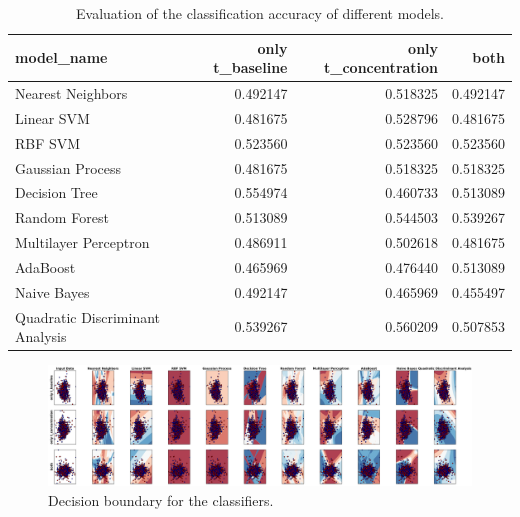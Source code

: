 \documentclass[12pt]{article}
\begin{document}
\begin{table}[h]


\begin{tabular}{lrrr}
\toprule
                      model\_name &  only t\_baseline &  only t\_concentration &      both \\
\midrule
               Nearest Neighbors &         0.492147 &              0.518325 &  0.492147 \\
                      Linear SVM &         0.481675 &              0.528796 &  0.481675 \\
                         RBF SVM &         0.523560 &              0.523560 &  0.523560 \\
                Gaussian Process &         0.481675 &              0.518325 &  0.518325 \\
                   Decision Tree &         0.554974 &              0.460733 &  0.513089 \\
                   Random Forest &         0.513089 &              0.544503 &  0.539267 \\
           Multilayer Perceptron &         0.486911 &              0.502618 &  0.481675 \\
                        AdaBoost &         0.465969 &              0.476440 &  0.513089 \\
                     Naive Bayes &         0.492147 &              0.465969 &  0.455497 \\
 Quadratic Discriminant Analysis &         0.539267 &              0.560209 &  0.507853 \\
\bottomrule
\end{tabular}
\caption{Evaluation of the classification accuracy of different models.}
\label{table:classification_accuracy}
\end{table}

\begin{figure}
  \centering
    \includegraphics[width=1.2\textwidth]{./figure/classification_result.pdf}
      \caption{Decision boundary for the classifiers.}
      \label{fig:decision_boundary}
\end{figure}
\end{document}
